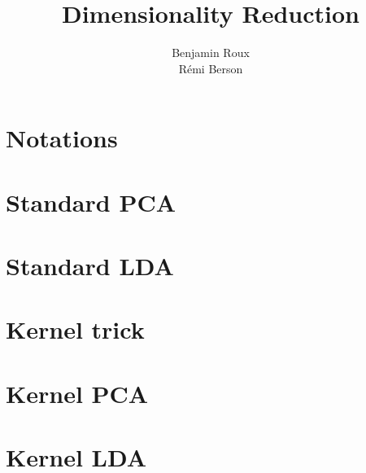 \documentclass[a4paper]{article}
\title{Dimensionality Reduction}
\author{Benjamin Roux \\ Rémi Berson}
\date{}
\begin{document}
\maketitle



\section*{Notations}


\section*{Standard PCA}


\section*{Standard LDA}


\section*{Kernel trick}


\section*{Kernel PCA}


\section*{Kernel LDA}

\end{document}
